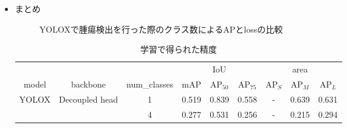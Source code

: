 \documentclass[a4j]{ujarticle}
\begin{document}
\begin{itemize}
                \item まとめ
                \begin{figure}[h]
                    \centering
                    \caption{YOLOXで腫瘍検出を行った際のクラス数によるAPとlossの比較}
                \end{figure}
                \begin{table}[h]
                    \centering
                    \caption{学習で得られた精度}
                    \label{tab:exp}
                    \begin{tabular}{ccc|ccc|ccc}
                            & & & & IoU & & & area \footnotemark & \\
                        model & backbone & num\_classes & mAP & AP$_{50}$ & AP$_{75}$ & AP$_S$ & AP$_M$ & AP$_L$ \\ \hline
                        \multirow{2}{*}{YOLOX\cite{yolox}} & \multirow{2}{*}{Decoupled head} & 1 & 0.519 & 0.839 & 0.558 & - & 0.639 & 0.631 \\
                            &  & 4 & 0.277 & 0.531 & 0.256 & - & 0.215 & 0.294 \\
                    \end{tabular}

\end{table}
\end{itemize}
\end{document}
